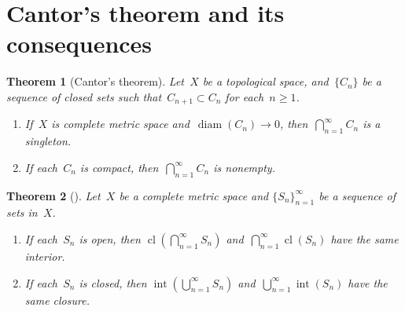 \documentclass[11pt,a4paper]{article}
\newtheorem{theorem}{Theorem}[section]
\theoremstyle{definition}
\newcommand{\diam}{\operatorname{diam}}
\DeclareMathOperator{\inter}{int}
\DeclareMathOperator{\cl}{cl}
\numberwithin{equation}{section}
\begin{document}
\section{Cantor's theorem and its consequences}

\begin{theorem}[Cantor's theorem] 
  \label{th:cantor}
  Let~$X$ be a topological space, and~$\{C_n\}$ be a sequence of
  closed sets such that~$C_{n+1}\subset C_n$ for each~$n\ge 1$. 
\begin{enumerate}
  \item If~$X$ is complete metric space and~$\diam(C_n)\to 0$, then~$\bigcap_{n=1}^\infty C_n$ is
    a singleton.
  \item If each~$C_n$ is compact, then~$\bigcap_{n=1}^\infty C_n$ is nonempty.
\end{enumerate}
\end{theorem}


\begin{theorem}[{\cite[Theorems~1.4.5--1.4.6]{Zalinescu_2002}}]
  \label{th:intclcm}
  Let~$X$ be a complete metric space and $\{S_n\}_{n=1}^\infty$ be a sequence of sets in~$X$. 
  \begin{enumerate}
    \item If each~$S_n$ is open, then $\cl(\bigcap_{n=1}^\infty S_n)$ and~$\bigcap_{n=1}^\infty \cl(S_n)$ have the same interior. 
    \item If each~$S_n$ is closed, then $\inter(\bigcup_{n=1}^\infty S_n)$ and~$\bigcup_{n=1}^\infty \inter(S_n)$ have the same closure. 
  \end{enumerate}
\end{theorem}
\end{document}
